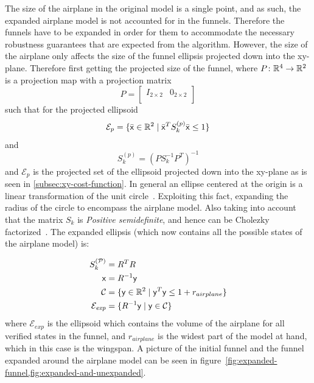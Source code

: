 The size of the airplane in the original model is a single point, and as such,
the expanded airplane model is not accounted for in the funnels. Therefore the
funnels have to be expanded in order for them to accommodate the necessary
robustness guarantees that are expected from the algorithm. However, the size of
the airplane only affects the size of the funnel ellipsis projected down into
the xy-plane. Therefore first getting the projected size of the funnel, where
\(P \colon \mathbb{R}^4 \rightarrow \mathbb{R}^2\) is a projection map with a projection matrix
\[
  P =
  \begin{bmatrix}
    I_{2 \times 2} & {0}_{2 \times 2} \\
  \end{bmatrix}
\]
such that for the projected ellipsoid
\[
  \mathcal{E}_{p} = \lbrace\bar{{\mathbf{\mathsf{x}}}} \in \mathbb{R}^{2} \mid
    {\bar{{\mathbf{\mathsf{x}}}}}^{T}S_{k}^{(p)}\bar{{\mathbf{\mathsf{x}}}} \leq 1\rbrace
\]
and
\[
  S_{k}^{(p)} = {\left( PS_{k}^{-1}P^T \right)}^{-1}
\]
and \(\mathcal{E}_{p}\) is the projected set of the ellipsoid projected down
into the xy-plane as is seen in \cref{subsec:xy-cost-function}. In general an
ellipse centered at the origin is a linear transformation of the unit
circle~\cite{lay2005linear}. Exploiting this fact, expanding the radius of the
circle to encompass the airplane model. Also taking into account that the matrix
\(S_{k}\) is \textit{Positive semidefinite}, and hence can be Cholezky
factorized~\cite{lay2005linear}. The expanded ellipsis (which now contains all
the possible states of the airplane model) is:

\begin{align*}
  S_{k}^{(\mathcal{P})} &= R^{T}R \\
  {\mathbf{\mathsf{x}}} &= R^{-1}{\mathbf{\mathsf{y}}} \\
  \mathcal{C} &= \lbrace{\mathbf{\mathsf{y}}} \in \mathbb{R}^2 \mid {\mathbf{\mathsf{y}}}^{T}{\mathbf{\mathsf{y}}} \leq 1 + r_{airplane}\rbrace \\
  \mathcal{E}_{\mathit{exp}} &= \lbrace R^{-1}{\mathbf{\mathsf{y}}} \mid {\mathbf{\mathsf{y}}} \in \mathcal{C}\rbrace \\
\end{align*}
where \(\mathcal{E}_{\mathit{exp}}\) is the ellipsoid which contains the volume
of the airplane for all verified states in the funnel, and
\(r_{\mathit{airplane}}\) is the widest part of the model at hand, which in this
case is the wingspan. A picture of the initial funnel and the funnel expanded
around the airplane model can be seen in
figure~\cref{fig:expanded-funnel,fig:expanded-and-unexpanded}.

